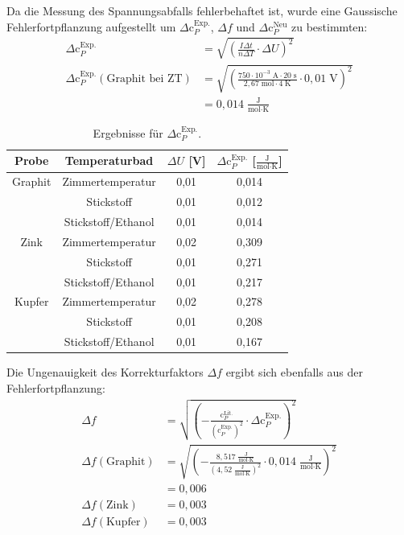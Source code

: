 \documentclass[12pt,a4paper,titlepage,headinclude,bibtotoc]{scrartcl}
\begin{document}
Da die Messung des Spannungsabfalls fehlerbehaftet ist, wurde eine Gaussische Fehlerfortpflanzung aufgestellt um $\Delta\text{c}_P^{\text{Exp.}}$, $\Delta f$ und $\Delta\text{c}_P^{\text{Neu}}$ zu bestimmten:
\begin{align}
\Delta \text{c}_P^{\text{Exp.}}&=\sqrt{ \left(\frac{I\Delta t}{n\Delta T}\cdot \Delta U \right)^2}\\
\Delta \text{c}_P^{\text{Exp.}}(\text{Graphit bei ZT})&=\sqrt{ \left(\frac{750\cdot 10^{-3}\;\text{A} \cdot 20\;\text{s}}{2,67\;\text{mol}\cdot 4\;\text{K}}\cdot 0,01\;\text{V} \right)^2}\\
&=0,014 \;\frac{\text{J}}{\text{mol}\cdot\text{K}}
\end{align}
\begin{table}[h!]
\centering
\caption{Ergebnisse für $\Delta \text{c}_P^{\text{Exp.}}$.}
\begin{tabular}{c|c|c|c}
Probe&Temperaturbad&$\Delta U$ [V]&$\Delta \text{c}_P^{\text{Exp.}}$ [$\frac{\text{J}}{\text{mol}\cdot\text{K}}$]\\
\hline
Graphit& Zimmertemperatur&0,01&0,014\\
\hline
&Stickstoff&0,01&0,012\\
\hline
&Stickstoff/Ethanol&0,01&0,014\\
\hline
Zink &Zimmertemperatur&0,02& 0,309 \\
\hline
&Stickstoff&0,01&0,271\\
\hline
&Stickstoff/Ethanol&0,01&0,217\\
\hline
Kupfer &Zimmertemperatur&0,02& 0,278\\
\hline
&Stickstoff&0,01&0,208\\
\hline
&Stickstoff/Ethanol&0,01&0,167\\
\end{tabular}
\end{table}
\FloatBarrier
Die Ungenauigkeit des Korrekturfaktors $\Delta f$ ergibt sich ebenfalls aus der Fehlerfortpflanzung:
\begin{align}
\Delta f &= \sqrt{ \left(-\frac{\text{c}_P^{\text{Lit.}}}{(\text{c}_P^{\text{Exp.}})^2}\cdot \Delta \text{c}_P^{\text{Exp.}} \right)^2}\\
\Delta f (\text{Graphit})&= \sqrt{ \left(-\frac{8,517\;\frac{\text{J}}{\text{mol}\cdot\text{K}}}{(4,52\;\frac{\text{J}}{\text{mol}\cdot\text{K}})^2}\cdot 0,014\;\frac{\text{J}}{\text{mol}\cdot\text{K}}\right)^2}\\
&= 0,006\\
\Delta f (\text{Zink})&=0,003\\ 
\Delta f (\text{Kupfer})&=0,003\\
\end{align} 
\end{document}
